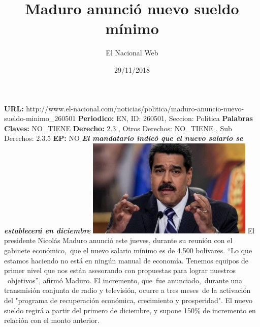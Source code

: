 \documentclass{article}%
\title{\textbf{Maduro anunció nuevo sueldo mínimo}}%
\author{El Nacional Web}%
\date{29/11/2018}%
\begin{document}
%
\normalsize%
\maketitle%
\textbf{URL: }%
http://www.el{-}nacional.com/noticias/politica/maduro{-}anuncio{-}nuevo{-}sueldo{-}minimo\_260501\newline%
%
\textbf{Periodico: }%
EN, %
ID: %
260501, %
Seccion: %
Política\newline%
%
\textbf{Palabras Claves: }%
NO\_TIENE\newline%
%
\textbf{Derecho: }%
2.3%
, Otros Derechos: %
NO\_TIENE%
, Sub Derechos: %
2.3.5%
\newline%
%
\textbf{EP: }%
NO\newline%
\newline%
%
\textbf{\textit{El mandatario indicó que el nuevo salario se establecerá en diciembre}}%
\newline%
\newline%
%
\includegraphics[width=300px]{261.jpg}%
\newline%
%
El presidente Nicolás Maduro anunció este jueves, durante su reunión con el gabinete económico,~que el nuevo salario mínimo es de 4.500 bolívares.%
\newline%
%
“Lo que estamos haciendo no está en ningún manual de economía. Tenemos equipos de primer nivel que nos están asesorando con propuestas para lograr nuestros ~objetivos”, afirmó Maduro.%
\newline%
%
El incremento, que~fue anunciado,~durante una transmisión conjunta de radio y televisión, ocurre a tres meses~de la activación del "programa de recuperación económica, crecimiento y prosperidad".%
\newline%
%
El nuevo sueldo regirá a partir del primero de diciembre, y supone 150\% de incremento en relación con el monto anterior.%
\newline%
%
\end{document}
